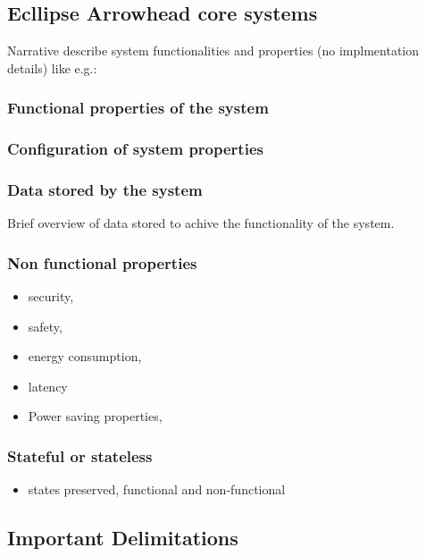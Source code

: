 \documentclass[a4paper]{arrowhead}
\begin{document}
\subsection{Ecllipse Arrowhead core systems}
\label{sec:core_systems}

\color{red}
Narrative describe system functionalities and properties (no
implmentation details) like e.g.:

\subsubsection {Functional properties of the system}

\subsubsection {Configuration of system properties}


\subsubsection {Data stored by the system}
Brief overview of data stored to achive the functionality of the system. 

\subsubsection {Non functional properties}
\begin{itemize}
  \item security, 
  \item safety, 
  \item energy consumption,
  \item latency
  \item Power saving properties, 
\end{itemize}


\subsubsection {Stateful or stateless}
\begin{itemize} 
\item states preserved, functional and non-functional
\end{itemize}  
\color{black}  


\subsection{Important Delimitations}
\label{sec:delimitations}
\end{document}
